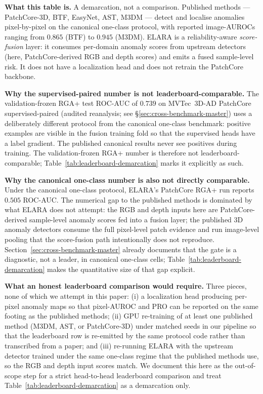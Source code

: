 \documentclass[10pt,conference]{IEEEtran}
\newcommand{\system}{ELARA}
\newcommand{\methodplus}{RGA+}
\begin{document}
\noindent\textbf{What this table is.} A demarcation, not a comparison.
Published methods --- PatchCore-3D, BTF, EasyNet, AST, M3DM --- detect
and localise anomalies pixel-by-pixel on the canonical one-class
protocol, with reported image-AUROCs ranging from $0.865$ (BTF) to
$0.945$ (M3DM). \system{} is a reliability-aware \emph{score-fusion}
layer: it consumes per-domain anomaly scores from upstream detectors
(here, PatchCore-derived RGB and depth scores) and emits a fused
sample-level risk. It does not have a localization head and does not
retrain the PatchCore backbone.

\noindent\textbf{Why the supervised-paired number is not
leaderboard-comparable.} The validation-frozen \methodplus{}
test ROC-AUC of $0.739$ on MVTec~3D-AD PatchCore supervised-paired
(audited reanalysis; see §\ref{sec:cross-benchmark-master}) uses a
deliberately different protocol from the canonical one-class
benchmark: positive examples are visible in the fusion training fold
so that the supervised heads have a label gradient. The published
canonical results never see positives during training. The
validation-frozen \methodplus{} number is therefore not
leaderboard-comparable; Table~\ref{tab:leaderboard-demarcation} marks it
explicitly as such.

\noindent\textbf{Why the canonical one-class number is also not
directly comparable.} Under the canonical one-class protocol,
\system{}'s PatchCore RGA+ run reports $0.505$ ROC-AUC. The numerical
gap to the published methods is dominated by what \system{} does not
attempt: the RGB and depth inputs here are PatchCore-derived
sample-level anomaly scores fed into a fusion layer; the published 3D
anomaly detectors consume the full pixel-level patch evidence and run
image-level pooling that the score-fusion path intentionally does not
reproduce. Section~\ref{sec:cross-benchmark-master} already documents
that the gate is a diagnostic, not a leader, in canonical one-class
cells; Table~\ref{tab:leaderboard-demarcation} makes the quantitative size of
that gap explicit.

\noindent\textbf{What an honest leaderboard comparison would require.}
Three pieces, none of which we attempt in this paper: (i) a localization
head producing per-pixel anomaly maps so that pixel-AUROC and PRO can
be reported on the same footing as the published methods; (ii) GPU
re-training of at least one published method (M3DM, AST, or
PatchCore-3D) under matched seeds in our pipeline so that the
leaderboard row is re-emitted by the same protocol code rather than
transcribed from a paper; and (iii) re-running \system{} with the
upstream detector trained under the same one-class regime that the
published methods use, so the RGB and depth input scores match. We
document this here as the out-of-scope step for a strict head-to-head
leaderboard comparison and treat Table~\ref{tab:leaderboard-demarcation} as a
demarcation only.
\end{document}

